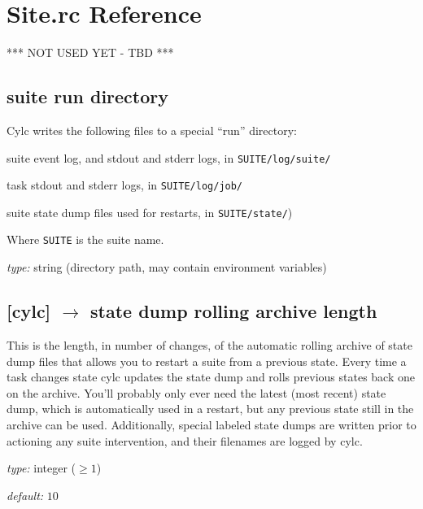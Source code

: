 \section{Site.rc Reference}
\label{SiteRCReference}

\lstset{language=bash}

*** NOT USED YET - TBD ***

\subsection[suite run directory]{suite run directory}

Cylc writes the following files to a special ``run'' directory:

\begin{myitemize}
    \item suite event log, and stdout and stderr logs, in \lstinline=SUITE/log/suite/=
    \item task stdout and stderr logs, in \lstinline=SUITE/log/job/= 
    \item suite state dump files used for restarts, in \lstinline=SUITE/state/=)
\end{myitemize}
Where \lstinline=SUITE= is the suite name.

\begin{myitemize}
    \item {\em type:} string (directory path, may contain environment variables)
\end{myitemize}

\subsection[state dump rolling archive length]{[cylc] $\rightarrow$ state dump rolling archive length}

This is the length, in number of changes, of the automatic rolling
archive of state dump files that allows you to restart a suite from a
previous state.  Every time a task changes state cylc updates the state
dump and rolls previous states back one on the archive. You'll probably
only ever need the latest (most recent) state dump, which is
automatically used in a restart, but any previous state still in the
archive can be used.  Additionally, special labeled state dumps are
written prior to actioning any suite intervention, and their filenames
are logged by cylc.

\begin{myitemize}
    \item {\em type:} integer ($\geq 1$)
    \item {\em default:} $10$
\end{myitemize}


